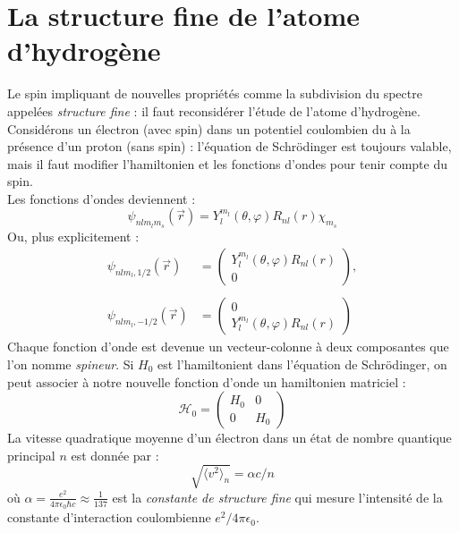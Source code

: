 \documentclass	[11pt, a4paper, openany]{book}
\begin{document}
	\section{La structure fine de l'atome d'hydrogène}
	Le spin impliquant de nouvelles propriétés comme la subdivision du spectre appelées 
	\textit{structure fine} : il faut reconsidérer l'étude de l'atome d'hydrogène.\\
	Considérons un électron (avec spin) dans un potentiel coulombien du à la présence 
	d'un proton (sans spin) : l'équation de Schrödinger est toujours valable, mais il 
	faut modifier l'hamiltonien et les fonctions d'ondes pour tenir compte du spin.\\
	Les fonctions d'ondes deviennent : 
	\begin{equation}
	\psi_{nlm_lm_s}(\vec{r}) = Y_l^{m_l}(\theta,\varphi)R_{nl}(r)\chi_{m_s}
	\end{equation}
	Ou, plus explicitement :
	\begin{equation}
	\begin{array}{ll}
	\psi_{nlm_l,1/2}(\vec{r}) &= \left(\begin{array}{cc}
	Y_l^{m_l}(\theta,\varphi)R_{nl}(r)\\
	0
	\end{array}\right),\\
	 & \\
	\psi_{nlm_l,-1/2}(\vec{r}) &= \left(\begin{array}{cc}
	0\\
	Y_l^{m_l}(\theta,\varphi)R_{nl}(r)
	\end{array}\right)
	\end{array}
	\end{equation}
	Chaque fonction d'onde est devenue un vecteur-colonne à deux composantes que l'on 
	nomme \textit{spineur}. Si $H_0$ est l'hamiltonient dans l'équation de Schrödinger,
	on peut associer à notre nouvelle fonction d'onde un hamiltonien matriciel :
	\begin{equation}
	\mathcal{H}_0 =\left(\begin{array}{cc}
	H_0 & 0\\
	0 & H_0
	\end{array}\right)
	\end{equation}
	La vitesse quadratique moyenne d'un électron dans un état de nombre quantique 
	principal $n$ est donnée par :
	\begin{equation}
	\sqrt{\langle v^2\rangle_n} = \alpha c/n
	\end{equation}
	où $\alpha = \frac{e^2}{4\pi\epsilon_0\hbar c}	 \approx \frac{1}{137}$ est la \textit{
	constante de structure fine} qui mesure l'intensité de la constante d'interaction 
	coulombienne $e^2/4\pi\epsilon_0$.\\
	
\end{document}
